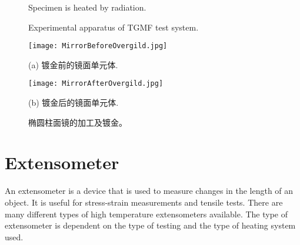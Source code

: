 \begin{figure}[!htp]
\centering{}
\caption{Specimen is heated by radiation.}
\label{Fig:Heating_Specimen}
\end{figure}

\begin{figure}[!htp]
\centering{}
\caption{Experimental apparatus of TGMF test system.}
\label{Fig:TGMF_Test_System}
\end{figure}

\begin{figure}
  \begin{minipage}[t]{0.5\linewidth} %
  \nonumber
    \centering
    \texttt{[image: MirrorBeforeOvergild.jpg]}
    \centerline{(a) 镀金前的镜面单元体.}
    \label{fig:side:a}
  \end{minipage}%
  \begin{minipage}[t]{0.5\linewidth}
    \centering
    \texttt{[image: MirrorAfterOvergild.jpg]}
    \centerline{(b) 镀金后的镜面单元体.}
    \label{fig:side:b}
  \end{minipage}

  \caption{椭圆柱面镜的加工及镀金。}
  \label{Fig:MirrorOvergild}
\end{figure}


\newpage
\section{Extensometer}
An extensometer is a device that is used to measure changes in the length of an object.
It is useful for stress-strain measurements and tensile tests.
There are many different types of high temperature extensometers available.
The type of extensometer is dependent on the type of testing and the type of heating system used.

